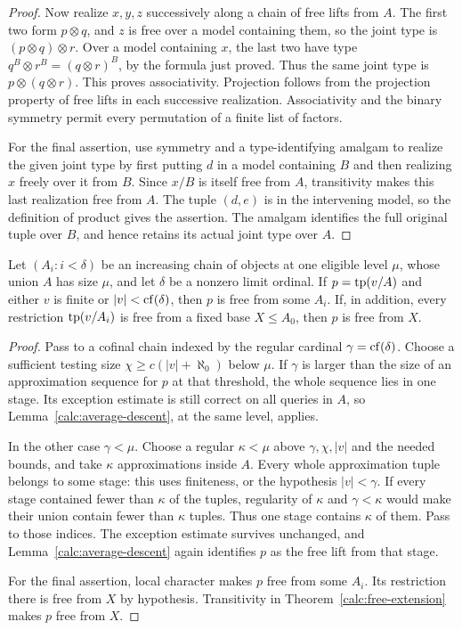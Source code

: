 \begin{proof}
Now realize $x,y,z$ successively along a chain of free lifts from
$A$.  The first two form $p\otimes q$, and $z$ is free over a model
containing them, so the joint type is $(p\otimes q)\otimes r$.
Over a model containing $x$, the last two have type
$q^B\otimes r^B=(q\otimes r)^B$, by the formula just proved.
Thus the same joint type is $p\otimes(q\otimes r)$.  This proves
associativity.  Projection follows from the projection property of
free lifts in each successive realization.  Associativity and the
binary symmetry permit every permutation of a finite list of factors.

For the final assertion, use symmetry and a type-identifying amalgam
to realize the given joint type by first putting $d$ in a model
containing $B$ and then realizing $x$ freely over it from $B$.
Since $x/B$ is itself free from $A$, transitivity makes this last
realization free from $A$.  The tuple $(d,e)$ is in the intervening
model, so the definition of product gives the assertion.  The amalgam
identifies the full original tuple over $B$, and hence retains its
actual joint type over $A$.
\end{proof}

\begin{proposition}
\label{calc:local-character}
Let $(A_i:i<\delta)$ be an increasing chain of objects at one eligible
level $\mu$, whose union $A$ has size $\mu$, and let $\delta$ be a
nonzero limit ordinal.  If $p=\operatorname{tp}(v/A)$ and either $v$ is finite or
$|v|<\operatorname{cf}(\delta)$, then $p$ is free from some $A_i$.
If, in addition, every restriction $\operatorname{tp}(v/A_i)$ is free from a fixed
base $X\leq A_0$, then $p$ is free from $X$.
\end{proposition}

\begin{proof}
Pass to a cofinal chain indexed by the regular cardinal
$\gamma=\operatorname{cf}(\delta)$.  Choose a sufficient testing size
$\chi\ge c(|v|+\aleph_0)$ below $\mu$.  If $\gamma$ is larger than
the size of an approximation sequence for $p$ at that threshold,
the whole sequence lies in one stage.  Its exception estimate is
still correct on all queries in $A$, so
Lemma~\ref{calc:average-descent}, at the same level, applies.

In the other case $\gamma<\mu$.  Choose a regular
$\kappa<\mu$ above $\gamma,\chi,|v|$ and the needed bounds, and
take $\kappa$ approximations inside $A$.  Every whole approximation
tuple belongs to some stage: this uses finiteness, or the hypothesis
$|v|<\gamma$.  If every stage contained fewer than $\kappa$ of the
tuples, regularity of $\kappa$ and $\gamma<\kappa$ would make their
union contain fewer than $\kappa$ tuples.  Thus one stage contains
$\kappa$ of them.  Pass to those indices.  The exception estimate
survives unchanged, and Lemma~\ref{calc:average-descent} again
identifies $p$ as the free lift from that stage.

For the final assertion, local character makes $p$ free from some
$A_i$.  Its restriction there is free from $X$ by hypothesis.
Transitivity in Theorem~\ref{calc:free-extension} makes $p$ free
from $X$.
\end{proof}

